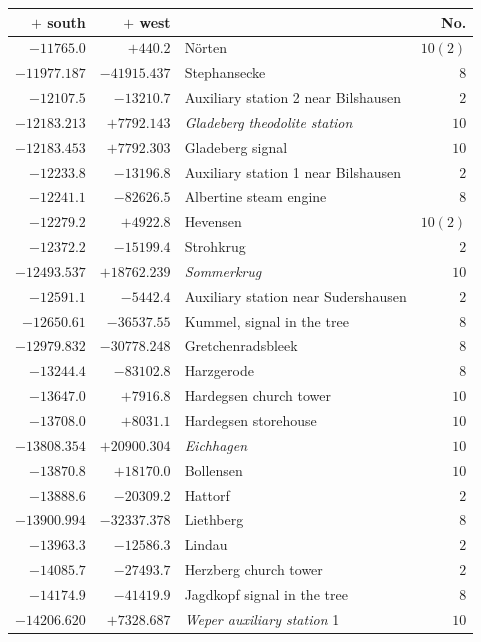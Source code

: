 \clearpage{}%
\begin{center}\begingroup\fontsize{8}{9}\selectfont
\setlength{\tabcolsep}{4pt}
\begin{tabular}{r|r|p{170pt}|r}\hline
\(+\) south&\(+\) west&&No.\\\hline
\(-11765.0\)&\(+440.2\)&Nörten&\(10 (2)\)\\
\(-11977.187\)&\(-41915.437\)&Stephansecke&\(8\)\\
\(-12107.5\)&\(-13210.7\)&Auxiliary station 2 near Bilshausen&\(2\)\\
\(-12183.213\)&\(+7792.143\)&\textit{Gladeberg theodolite station}&\(10\)\\
\(-12183.453\)&\(+7792.303\)&Gladeberg signal&\(10\)\\
\(-12233.8\)&\(-13196.8\)&Auxiliary station 1 near Bilshausen&\(2\)\\
\(-12241.1\)&\(-82626.5\)&Albertine steam engine&\(8\)\\
\(-12279.2\)&\(+4922.8\)&Hevensen&\(10 (2)\)\\
\(-12372.2\)&\(-15199.4\)&Strohkrug&\(2\)\\
\(-12493.537\)&\(+18762.239\)&\textit{Sommerkrug}&\(10\)\\
\(-12591.1\)&\(-5442.4\)&Auxiliary station near Sudershausen&\(2\)\\
\(-12650.61\)&\(-36537.55\)&Kummel, signal in the tree&\(8\)\\
\(-12979.832\)&\(-30778.248\)&Gretchenradsbleek&\(8\)\\
\(-13244.4\)&\(-83102.8\)&Harzgerode&\(8\)\\
\(-13647.0\)&\(+7916.8\)&Hardegsen church tower&\(10\)\\
\(-13708.0\)&\(+8031.1\)&Hardegsen storehouse&\(10\)\\
\(-13808.354\)&\(+20900.304\)&\textit{Eichhagen}&\(10\)\\
\(-13870.8\)&\(+18170.0\)&Bollensen&\(10\)\\
\(-13888.6\)&\(-20309.2\)&Hattorf&\(2\)\\
\(-13900.994\)&\(-32337.378\)&Liethberg&\(8\)\\
\(-13963.3\)&\(-12586.3\)&Lindau&\(2\)\\
\(-14085.7\)&\(-27493.7\)&Herzberg church tower&\(2\)\\
\(-14174.9\)&\(-41419.9\)&Jagdkopf signal in the tree&\(8\)\\
\(-14206.620\)&\(+7328.687\)&\textit{Weper auxiliary station} 1&\(10\)\\

\end{tabular}
\end{center}
